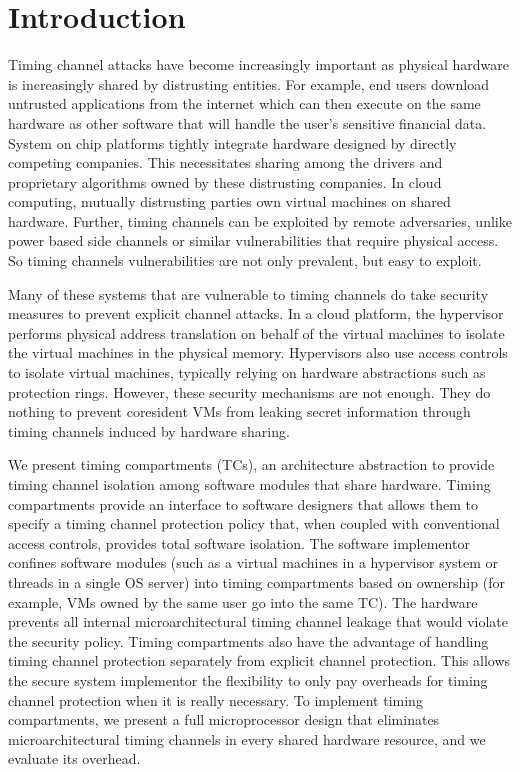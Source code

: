 \section{Introduction}
Timing channel attacks have become increasingly important as physical hardware 
is increasingly shared by distrusting entities. For example, end users download 
untrusted applications from the internet which can then execute on the same 
hardware as other software that will handle the user's sensitive financial 
data. System on chip platforms tightly integrate hardware designed by directly 
competing companies. This necessitates sharing among the drivers and 
proprietary algorithms owned by these distrusting companies. In cloud 
computing, mutually distrusting parties own virtual machines on shared 
hardware. Further, timing channels can be exploited by remote adversaries, 
unlike power based side channels or similar vulnerabilities that require 
physical access. So timing channels vulnerabilities are not only prevalent, but 
easy to exploit.

Many of these systems that are vulnerable to timing channels do take security 
measures to prevent explicit channel attacks. In a cloud platform, the 
hypervisor performs physical address translation on behalf of the virtual 
machines to isolate the virtual machines in the physical memory. Hypervisors 
also use access controls to isolate virtual machines, typically relying on 
hardware abstractions such as protection rings. However, these security 
mechanisms are not enough. They do nothing to prevent coresident VMs from 
leaking secret information through timing channels induced by hardware sharing.

We present timing compartments (TCs), an architecture abstraction to provide 
timing channel isolation among software modules that share hardware.
Timing compartments provide an interface to software designers that allows them 
to specify a timing channel protection policy that, when coupled with 
conventional access controls, provides total software isolation. The software 
implementor confines software modules (such as a virtual machines in a 
hypervisor system or threads in a single OS server) into timing
compartments based on ownership (for example, VMs owned by the same user go 
into the same TC). The hardware prevents all internal microarchitectural timing 
channel leakage that would violate the security policy. Timing compartments 
also have the advantage of handling timing channel protection separately from 
explicit channel protection. This allows the secure system implementor the 
flexibility to only pay overheads for timing channel protection when it is 
really necessary. To implement timing compartments, we present a full 
microprocessor design that eliminates microarchitectural timing channels in 
every shared hardware resource, and we evaluate its overhead.

